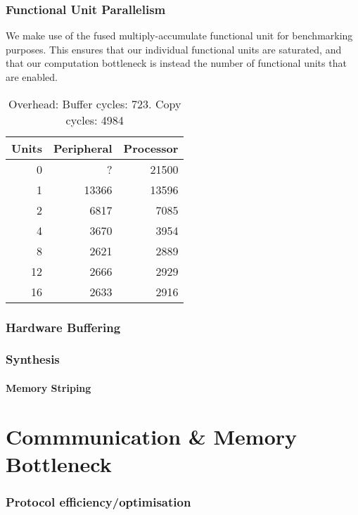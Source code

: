 \documentclass[a4paper,8pt]{report}
\begin{document}
\subsection{Functional Unit Parallelism}
We make use of the fused multiply-accumulate functional unit for benchmarking
purposes. This ensures that our individual functional units are saturated, and
that our computation bottleneck is instead the number of functional units that
are enabled.

\begin{table}
  \centering
  \begin{tabular}{r|rr}
    \toprule
    Units & Peripheral & Processor \\
    \midrule
    0  &     ? & 21500 \\
    1  & 13366 & 13596 \\
    2  &  6817 &  7085 \\
    4  &  3670 &  3954 \\
    8  &  2621 &  2889 \\
    12 &  2666 &  2929 \\
    16 &  2633 &  2916 \\
    \bottomrule
  \end{tabular}
  \caption{Overhead: Buffer cycles: 723. Copy cycles: 4984}
\end{table}


\subsection{Hardware Buffering}

\subsection{Synthesis}
\subsubsection{Memory Striping}


\chapter{Commmunication \& Memory Bottleneck}
\subsection{Protocol efficiency/optimisation}
\end{document}
